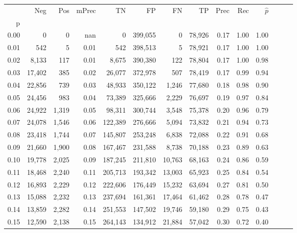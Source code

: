 \begin{tabular}{rrrrrrrrrrrrrr}
\toprule
{} &     Neg &    Pos & mPrec &       TN &       FP &      FN &      TP &  Prec &   Rec & $\hat{p}$ \\
p    &         &        &       &          &          &         &         &       &       &           \\
\midrule
0.00 &       0 &      0 &   nan &        0 &  399,055 &       0 &  78,926 &  0.17 &  1.00 &      1.00 \\
0.01 &     542 &      5 &  0.01 &      542 &  398,513 &       5 &  78,921 &  0.17 &  1.00 &      1.00 \\
0.02 &   8,133 &    117 &  0.01 &    8,675 &  390,380 &     122 &  78,804 &  0.17 &  1.00 &      0.98 \\
0.03 &  17,402 &    385 &  0.02 &   26,077 &  372,978 &     507 &  78,419 &  0.17 &  0.99 &      0.94 \\
0.04 &  22,856 &    739 &  0.03 &   48,933 &  350,122 &   1,246 &  77,680 &  0.18 &  0.98 &      0.90 \\
0.05 &  24,456 &    983 &  0.04 &   73,389 &  325,666 &   2,229 &  76,697 &  0.19 &  0.97 &      0.84 \\
0.06 &  24,922 &  1,319 &  0.05 &   98,311 &  300,744 &   3,548 &  75,378 &  0.20 &  0.96 &      0.79 \\
0.07 &  24,078 &  1,546 &  0.06 &  122,389 &  276,666 &   5,094 &  73,832 &  0.21 &  0.94 &      0.73 \\
0.08 &  23,418 &  1,744 &  0.07 &  145,807 &  253,248 &   6,838 &  72,088 &  0.22 &  0.91 &      0.68 \\
0.09 &  21,660 &  1,900 &  0.08 &  167,467 &  231,588 &   8,738 &  70,188 &  0.23 &  0.89 &      0.63 \\
0.10 &  19,778 &  2,025 &  0.09 &  187,245 &  211,810 &  10,763 &  68,163 &  0.24 &  0.86 &      0.59 \\
0.11 &  18,468 &  2,240 &  0.11 &  205,713 &  193,342 &  13,003 &  65,923 &  0.25 &  0.84 &      0.54 \\
0.12 &  16,893 &  2,229 &  0.12 &  222,606 &  176,449 &  15,232 &  63,694 &  0.27 &  0.81 &      0.50 \\
0.13 &  15,088 &  2,232 &  0.13 &  237,694 &  161,361 &  17,464 &  61,462 &  0.28 &  0.78 &      0.47 \\
0.14 &  13,859 &  2,282 &  0.14 &  251,553 &  147,502 &  19,746 &  59,180 &  0.29 &  0.75 &      0.43 \\
0.15 &  12,590 &  2,138 &  0.15 &  264,143 &  134,912 &  21,884 &  57,042 &  0.30 &  0.72 &      0.40 \\

\end{tabular}
